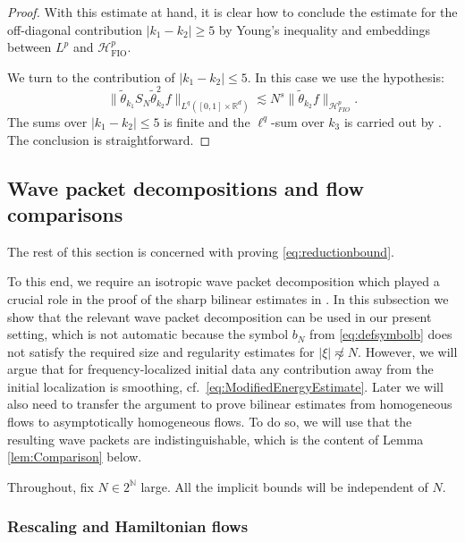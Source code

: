 \documentclass{amsart}
\numberwithin{equation}{section}
\theoremstyle{definition}
\newcommand{\R}{\mathbb{R}}
\newcommand{\N}{\mathbb{N}}
\begin{document}
\begin{proof}
{With this estimate at hand, it is clear how to conclude the estimate for the off-diagonal contribution $|k_1-k_2| \geq 5$ by Young's inequality and embeddings between $L^p$ and $\mathcal{H}^p_{\text{FIO}}$.

We turn to the contribution of $|k_1-k_2| \leq 5$. In this case we use the hypothesis:
\begin{equation*}
\| \tilde{\theta}_{k_1} S_N \tilde{\theta}^2_{k_2} f \|_{L^q([0,1] \times \R^d)} \lesssim N^s \| \tilde{\theta}_{k_2} f \|_{\mathcal{H}^p_{FIO}}.
\end{equation*}
The sums over $|k_1-k_2| \leq 5$ is finite and the $\ell^q$-sum over $k_3$ is carried out by \cite[Theorem~3.6]{LiuRozendaalSongYan2024}. The conclusion is straightforward.}
\end{proof}


\subsection{Wave packet decompositions and flow comparisons}\label{subsec:wavedecomp}

The rest of this section is concerned with proving \eqref{eq:reductionbound}. 

To this end, we require an isotropic wave packet decomposition which played a crucial role in the proof of the sharp bilinear estimates in \cite{SchippaTataru2025}. In this subsection we show that the relevant wave packet decomposition can be used in our present setting, which is not automatic because %
the symbol $b_{N}$ from \eqref{eq:defsymbolb} does not satisfy the required size and regularity estimates for $|\xi| \not\eqsim N$. However, we will argue that for frequency-localized initial data any contribution away from the initial localization is smoothing, cf.~\eqref{eq:ModifiedEnergyEstimate}.
Later we will also need to transfer the argument to prove bilinear estimates from homogeneous flows to asymptotically homogeneous flows. To do so, we will use that the resulting wave packets are indistinguishable, which is the content of Lemma \ref{lem:Comparison} below. 

Throughout, fix $N\in 2^{\N}$ large. %
All the implicit bounds will be independent of $N$. 


\subsubsection{Rescaling and Hamiltonian flows}
\end{document}
